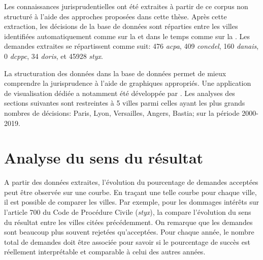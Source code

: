 Les connaissances jurisprudentielles ont été extraites à partir de ce corpus non structuré à l'aide des approches proposées dans cette thèse. Après cette extraction, les décisions de la base de données sont réparties entre les villes identifiées automatiquement comme sur la  et dans le temps comme sur la . Les demandes extraites se répartissent comme suit: 476 \textit{acpa}, 409 \textit{concdel}, 160 \textit{danais}, 0 \textit{dcppc}, 34 \textit{doris}, et 45928 \textit{styx}.  



La structuration des données dans la base de données permet de mieux comprendre la jurisprudence à l'aide de graphiques appropriés. Une application de visualisation dédiée a notamment été développée  par \citet{PRYSIAZHNIUK2017jurisprudence-demo-web}.
Les analyses des sections suivantes sont restreintes à 5 villes parmi celles ayant les plus grands nombres de décisions: Paris, Lyon, Versailles, Angers, Bastia; sur la période 2000-2019.

\section{Analyse du sens du résultat}
A partir des données extraites, l'évolution du pourcentage de demandes acceptées  peut être observée sur une courbe. En traçant une telle courbe pour chaque ville, il est possible de comparer les villes.
Par exemple, pour les dommages intérêts sur l'article 700 du Code de Procédure Civile (\textit{styx}), la  compare l'évolution du sens du résultat entre les villes citées précédemment. On remarque que les demandes sont beaucoup plus souvent rejetées qu'acceptées. Pour chaque année, le nombre total de demandes doit être associée pour savoir si le pourcentage de succès est réellement interprétable et comparable à celui des autres années.

